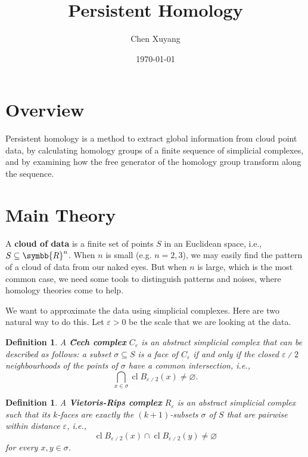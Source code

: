 \documentclass{assignment}[2019/10/15]
\title{Persistent Homology}
\author{Chen Xuyang}
\date{\today}
\institute{School of Mathematical Science}
\theoremstyle{plain}
\newtheorem{definition}[theorem]{Definition}
\newcommand{\RR}{\symbb{R}}
\renewcommand{\emph}[1]{\textbf{#1}}
\newcommand{\CECH}{\u{C}ech}
\newcommand{\DIV}{{\divslash}}
\DeclareMathOperator{\CL}{cl}
\begin{document}
  \maketitle

  \section*{Overview}

  Persistent homology is a method to extract global information from cloud point data, by calculating homology groups of a finite sequence of simplicial complexes, and by examining how the free generator of the homology group transform along the sequence.

  \section*{Main Theory}

  A \emph{cloud of data} is a finite set of points $S$ in an Euclidean space, i.e., $S\subseteq \RR^n$. When $n$ is small (e.g. $n=2, 3$), we may easily find the pattern of a cloud of data from our naked eyes. But when $n$ is large, which is the most common case, we need some tools to distinguish patterns and noises, where homology theories come to help.

  We want to approximate the data using simplicial complexes. Here are two natural way to do this. Let $\varepsilon>0$ be the scale that we are looking at the data.

  \begin{definition}
    A \emph{{\CECH} complex} $C_\varepsilon$ is an abstract simplicial complex that can be described as follows: a subset $\sigma\subseteq S$ is a face of $C_\varepsilon$ if and only if the closed $\varepsilon\DIV 2$ neighbourhoods of the points of $\sigma$ have a common intersection, i.e.,
    \begin{equation*}
      \bigcap_{x\in\sigma} \CL B_{\varepsilon\DIV 2}(x)\neq \varnothing.
    \end{equation*}
  \end{definition}

  \begin{definition}
    A \emph{Vietoris-Rips complex} $R_\varepsilon$ is an abstract simplicial complex such that its $k$-faces are exactly the $(k+1)$-subsets $\sigma$ of $S$ that are pairwise within distance $\varepsilon$, i.e.,
    \begin{equation*}
      \CL B_{\varepsilon\DIV 2}(x)\cap \CL B_{\varepsilon\DIV 2}(y)\neq \varnothing
    \end{equation*}
    for every $x, y\in\sigma$.
  \end{definition}
\end{document}
